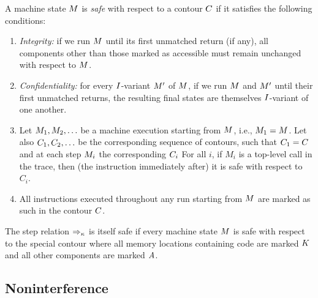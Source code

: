 \documentclass[conference]{IEEEtran}
\begin{document}
A machine state $M$ is {\em safe} with respect to a contour $C$
 if it satisfies the following conditions:
%
\begin{enumerate}

\item {\em Integrity:} if we run $M$ until its first unmatched return (if
  any), all components other than those marked as accessible must remain
  unchanged with respect to $M$. 

\item {\em Confidentiality:} for every $I$-variant $M'$ of $M$, if
  we run $M$ and $M'$ until their first unmatched returns, the resulting
  final states are themselves $I$-variant of one another. 

\item Let $M_1, M_2, \ldots$ be a machine execution starting from
  $M$, i.e., $M_1 = M$. Let also $C_1, C_2, \ldots$
  be the corresponding sequence of contours, such that $C_1 = C$
  and at each step $M_i$ the corresponding $C_i$  For all $i$,
  if $M_i$ is a top-level call in the trace, then (the instruction immediately
  after) it  is safe with respect to $C_i$.

\item All instructions executed throughout any run starting from $M$ are
  marked as such in the contour $C$. 

\end{enumerate}

The step relation $\Rightarrow_\kappa$ is itself safe if every machine state $M$ is
safe with respect to the special contour where all memory locations containing
code are marked $K$ and all other components are marked $A$.

\subsection{Noninterference}

\iftext
{}
\end{document}
